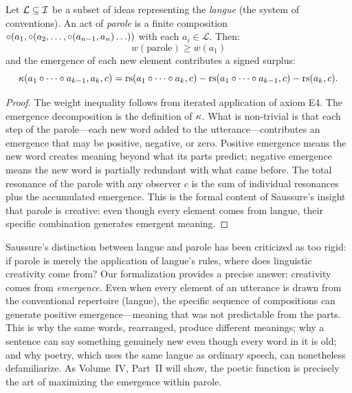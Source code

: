 \begin{theorem}
\label{thm:parole-instance}
Let $\mathcal{L} \subseteq \mathcal{I}$ be a subset of ideas representing the \emph{langue} (the system of conventions). An act of \emph{parole} is a finite composition $\circ(a_1, \circ(a_2, \ldots, \circ(a_{n-1}, a_n) \ldots))$ with each $a_i \in \mathcal{L}$. Then:
\[
  w(\text{parole}) \geq w(a_1)
\]
and the emergence of each new element contributes a signed surplus:
\[
  \kappa(a_1 \circ \cdots \circ a_{k-1}, a_k, c) = \mathrm{rs}(a_1 \circ \cdots \circ a_k, c) - \mathrm{rs}(a_1 \circ \cdots \circ a_{k-1}, c) - \mathrm{rs}(a_k, c).
\]
\end{theorem}

\begin{proof}
The weight inequality follows from iterated application of axiom E4. The emergence decomposition is the definition of $\kappa$. What is non-trivial is that each step of the parole---each new word added to the utterance---contributes an emergence that may be positive, negative, or zero. Positive emergence means the new word creates meaning beyond what its parts predict; negative emergence means the new word is partially redundant with what came before. The total resonance of the parole with any observer $c$ is the sum of individual resonances plus the accumulated emergence. This is the formal content of Saussure's insight that parole is creative: even though every element comes from langue, their specific combination generates emergent meaning.
\end{proof}

\begin{interpretation}
Saussure's distinction between langue and parole has been criticized as too rigid: if parole is merely the application of langue's rules, where does linguistic creativity come from? Our formalization provides a precise answer: creativity comes from \emph{emergence}. Even when every element of an utterance is drawn from the conventional repertoire (langue), the specific sequence of compositions can generate positive emergence---meaning that was not predictable from the parts. This is why the same words, rearranged, produce different meanings; why a sentence can say something genuinely new even though every word in it is old; and why poetry, which uses the same langue as ordinary speech, can nonetheless defamiliarize. As Volume~IV, Part~II will show, the poetic function is precisely the art of maximizing the emergence within parole.
\end{interpretation}


